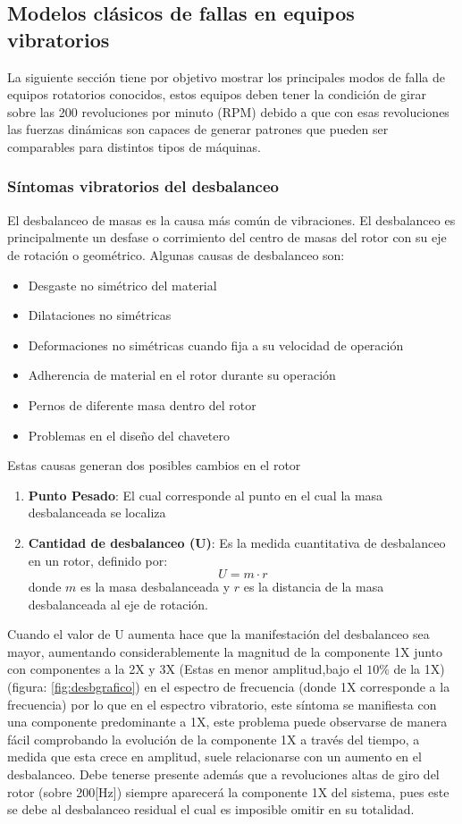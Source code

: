 	 		\subsection{Modelos clásicos de fallas en equipos vibratorios}
	 			La siguiente sección tiene por objetivo mostrar los principales modos de falla de equipos rotatorios conocidos, estos equipos deben tener la condición de girar sobre las 200 revoluciones por minuto (RPM) debido a que con esas revoluciones las fuerzas dinámicas son capaces de generar patrones que pueden ser comparables para distintos tipos de máquinas.
	 			\subsubsection{Síntomas vibratorios del desbalanceo}
	 				El desbalanceo de masas es la causa más común de vibraciones. El desbalanceo es principalmente un desfase o corrimiento del centro de masas del rotor con su eje de rotación o geométrico. Algunas causas de desbalanceo son:
	 				\begin{itemize}
	 					\item Desgaste no simétrico del material
	 					\item Dilataciones no simétricas
	 					\item Deformaciones no simétricas cuando fija a su velocidad de operación
	 					\item Adherencia de material en el rotor durante su operación 
	 					\item Pernos de diferente masa dentro del rotor
	 					\item Problemas en el diseño del chavetero
	 				\end{itemize}
	 				Estas causas generan dos posibles cambios en el rotor
	 				\begin{enumerate}
	 					\item \textbf{Punto Pesado}: El cual corresponde al punto en el cual la masa desbalanceada se localiza
	 					\item \textbf{Cantidad de desbalanceo (U)}: Es la medida cuantitativa de desbalanceo en un rotor, definido por: $$ U= m \cdot r $$
	 					donde $m$ es la masa desbalanceada y $r$ es la distancia de la masa desbalanceada al eje de rotación.
	 				\end{enumerate} 
	 				Cuando el valor de U aumenta hace que la manifestación del desbalanceo sea mayor, aumentando considerablemente la magnitud de la componente 1X junto con componentes a la 2X y 3X (Estas en menor amplitud,bajo el $10\% $ de la 1X) (figura: \ref{fig:desbgrafico}) en el espectro de frecuencia (donde 1X corresponde a la frecuencia) por lo que en el espectro vibratorio, este síntoma se manifiesta con una componente predominante a 1X, este problema puede observarse de manera fácil comprobando la evolución de la componente 1X a través del tiempo, a medida que esta crece en amplitud, suele relacionarse con un aumento en el desbalanceo. Debe tenerse presente además que a revoluciones altas de giro del rotor (sobre 200[Hz]) siempre aparecerá la componente 1X del sistema, pues este se debe al desbalanceo residual el cual es imposible omitir en su totalidad.
